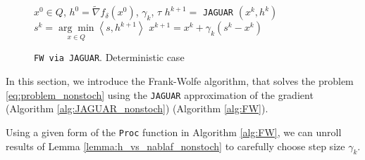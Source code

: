         \begin{wrapfigure}[9]{r}{6cm}
        \vspace{-0.65cm}
        \begin{minipage}{6cm}
        \vspace{-0.4cm}
        \begin{algorithm}[H]
    	\caption{\texttt{FW via JAGUAR}. Deterministic case}
    	\label{alg:FW}
        	\begin{algorithmic}[1]
        		 $x^0 \in Q$, $h^0 = \widetilde\nabla f_{\delta}(x^0)$, $\gamma_k$, $\tau$
                    \State $h^{k+1} = $ \texttt{JAGUAR} $\left( x^k, h^k \right)$ \label{line:jaguar_nonstoch}
                    \State $s^k = \underset{x \in Q}{\arg\min}\left<s, h^{k+1} \right>$ \label{line:s^k}
                    \State $x^{k+1} = x^k + \gamma_k (s^k - x^k)$ \label{line:x^k}
                \EndFor
        	\end{algorithmic}
        \end{algorithm}
        \end{minipage}
        \end{wrapfigure}

        In this section, we introduce the Frank-Wolfe algorithm, that solves the problem \eqref{eq:problem_nonstoch} using the \texttt{JAGUAR} approximation of the gradient (Algorithm \ref{alg:JAGUAR_nonstoch}) (Algorithm \ref{alg:FW}).

        Using a given form of the \texttt{Proc} function in Algorithm \ref{alg:FW}, we can unroll results of Lemma \ref{lemma:h_vs_nablaf_nonstoch} to carefully choose step size $\gamma_k$.

